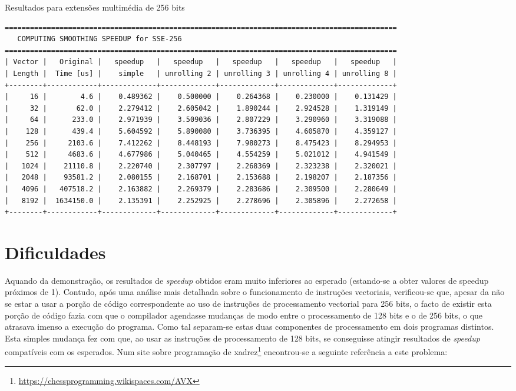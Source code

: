 \documentclass[a4paper]{article}
\begin{document}
	
	\begin{table}[H]
	\caption{Resultados para extensões multimédia de 256 bits}
	\label{tab:results_256}
	\begin{Verbatim}[fontsize=\small,xleftmargin=-3mm]
=============================================================================================
   COMPUTING SMOOTHING SPEEDUP for SSE-256
=============================================================================================
| Vector |   Original |   speedup   |   speedup   |   speedup   |   speedup   |   speedup   |
| Length |  Time [us] |    simple   | unrolling 2 | unrolling 3 | unrolling 4 | unrolling 8 |
+--------+------------+-------------+-------------+-------------+-------------+-------------+
|     16 |        4.6 |    0.489362 |    0.500000 |    0.264368 |    0.230000 |    0.131429 |
|     32 |       62.0 |    2.279412 |    2.605042 |    1.890244 |    2.924528 |    1.319149 |
|     64 |      233.0 |    2.971939 |    3.509036 |    2.807229 |    3.290960 |    3.319088 |
|    128 |      439.4 |    5.604592 |    5.890080 |    3.736395 |    4.605870 |    4.359127 |
|    256 |     2103.6 |    7.412262 |    8.448193 |    7.980273 |    8.475423 |    8.294953 |
|    512 |     4683.6 |    4.677986 |    5.040465 |    4.554259 |    5.021012 |    4.941549 |
|   1024 |    21110.8 |    2.220740 |    2.307797 |    2.268369 |    2.323238 |    2.320021 |
|   2048 |    93581.2 |    2.080155 |    2.168701 |    2.153688 |    2.198207 |    2.187356 |
|   4096 |   407518.2 |    2.163882 |    2.269379 |    2.283686 |    2.309500 |    2.280649 |
|   8192 |  1634150.0 |    2.135391 |    2.252925 |    2.278696 |    2.305896 |    2.272658 |
+--------+------------+-------------+-------------+-------------+-------------+-------------+
	\end{Verbatim}
	\end{table}

	
	\section{Dificuldades}
	
	 Aquando da demonstração, os resultados de \textit{speedup} obtidos eram muito inferiores ao esperado (estando-se a obter valores de speedup próximos de 1). Contudo, após uma análise mais detalhada sobre o funcionamento de instruções vectoriais, verificou-se que, apesar da não se estar a usar a porção de código correspondente ao uso de instruções de processamento vectorial para 256 bits, o facto de existir esta porção de código fazia com que o compilador agendasse mudanças de modo entre o processamento de 128 bits e o de 256 bits, o que atrasava imenso a execução do programa. Como tal separam-se estas duas componentes de processamento em dois programas distintos. Esta simples mudança fez com que, ao usar as instruções de processamento de 128 bits, se conseguisse atingir resultados de \textit{speedup} compatíveis com os esperados. Num site sobre programação de xadrez\footnote{\url{https://chessprogramming.wikispaces.com/AVX}} encontrou-se a seguinte referência a este problema:
	 
\end{document}
